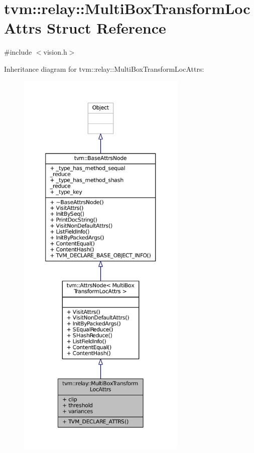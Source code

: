 \hypertarget{structtvm_1_1relay_1_1MultiBoxTransformLocAttrs}{}\section{tvm\+:\+:relay\+:\+:Multi\+Box\+Transform\+Loc\+Attrs Struct Reference}
\label{structtvm_1_1relay_1_1MultiBoxTransformLocAttrs}


{\ttfamily \#include $<$vision.\+h$>$}



Inheritance diagram for tvm\+:\+:relay\+:\+:Multi\+Box\+Transform\+Loc\+Attrs\+:
\nopagebreak
\begin{figure}[H]
\begin{center}
\leavevmode
\includegraphics[height=550pt]{structtvm_1_1relay_1_1MultiBoxTransformLocAttrs__inherit__graph}
\end{center}
\end{figure}



